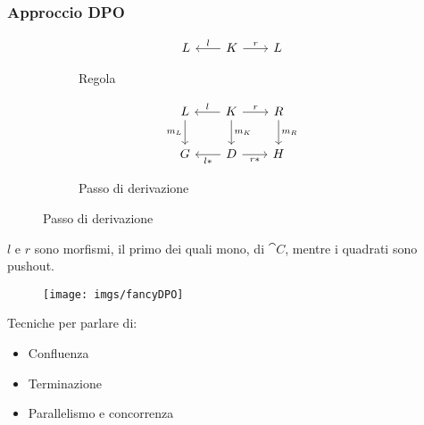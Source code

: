 \documentclass[8pt]{beamer}
\begin{document}
\begin{frame}[fragile]\frametitle{Approccio DPO}
	\begin{figure}[h]
		\begin{subfigure}{0.25\textwidth}
			\[\begin{tikzcd}[row sep = 20, column sep = 20] L & K \arrow[r, "r"] \arrow[l, "l"swap] & L \end{tikzcd}\]
		\label{fig:rule}
		\caption{Regola}
		\end{subfigure}
		\qquad
		\begin{subfigure}{0.25\textwidth}
			\[\begin{tikzcd}[row sep = 20, column sep = 20]
			L \arrow[d, "{m_L}"swap] & K\arrow[d, "{m_K}"] \arrow[r, "r"] \arrow[l, "l"swap] & R \arrow[d, "{m_R}"] \\
				G & D \arrow[l, "{l*}"] \arrow[r, "{r*}"swap] & H
		\end{tikzcd}\]
		\caption{Passo di derivazione}
		\label{fig:step}
		\end{subfigure}
	\end{figure}
	$l$ e $r$ sono morfismi, il primo dei quali mono, di $\cat C$, 
	mentre i quadrati sono pushout.

	\begin{wrapfigure}{ri}{0.5\textwidth}
		\texttt{[image: imgs/fancyDPO]}
	\end{wrapfigure}

\smallskip 

	Tecniche per parlare di:
	\begin{itemize}
		\item Confluenza
		\item Terminazione
		\item Parallelismo e concorrenza
	\end{itemize}
\end{frame}
\end{document}

